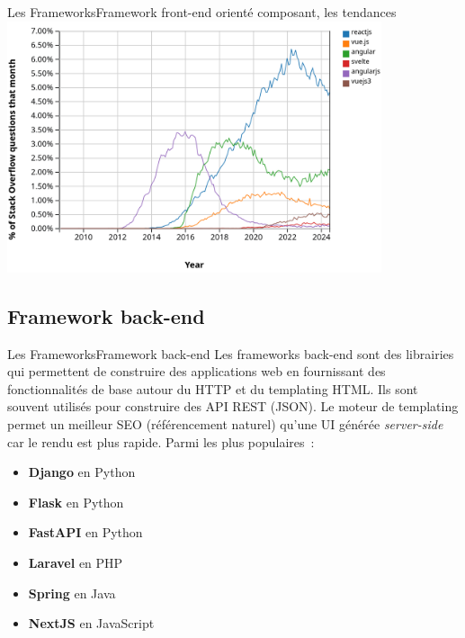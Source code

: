 \documentclass{beamer}
\begin{document}
    \begin{frame}{Les Frameworks}{Framework front-end orienté composant, les tendances}
        \centering
        \includegraphics[width=11cm]{image/front-compo-trends}
    \end{frame}

    \subsection{Framework back-end}\label{subsec:framewok-back-end}

    \begin{frame}{Les Frameworks}{Framework back-end}
        Les frameworks back-end sont des librairies qui permettent de construire des applications web en fournissant des fonctionnalités de base autour du HTTP et du templating HTML.
        \bigbreak
        Ils sont souvent utilisés pour construire des API REST (JSON).
        Le moteur de templating permet un meilleur SEO (référencement naturel) qu'une UI générée \textit{server-side} car le rendu est plus rapide.
        \bigbreak
        Parmi les plus populaires~:
        \begin{itemize}
            \item \textbf{Django} en Python
            \item \textbf{Flask} en Python
            \item \textbf{FastAPI} en Python
            \item \textbf{Laravel} en PHP
            \item \textbf{Spring} en Java
            \item \textbf{NextJS} en JavaScript
        \end{itemize}
    \end{frame}
\end{document}

